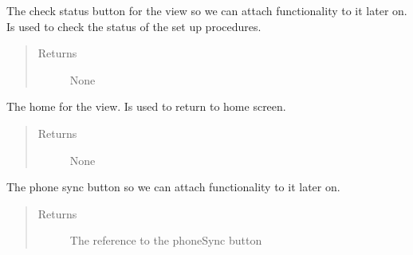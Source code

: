 \documentclass[letterpaper,10pt,english]{sphinxmanual}
\begin{document}
\begin{fulllineitems}
\begin{fulllineitems}
\label{\detokenize{index:src.Views.View_VerifySetupScreen.VerifySetupWindow.set_BtnCheck}}
The check status button for the view so we can attach functionality to it later on.
Is used to check the status of the set up procedures.
\begin{quote}\begin{description}
\item[{Returns}] \leavevmode
None

\end{description}\end{quote}

\end{fulllineitems}


\begin{fulllineitems}
\label{\detokenize{index:src.Views.View_VerifySetupScreen.VerifySetupWindow.set_BtnHome}}
The home for the view. Is used to return to home screen.
\begin{quote}\begin{description}
\item[{Returns}] \leavevmode
None

\end{description}\end{quote}

\end{fulllineitems}


\begin{fulllineitems}
\label{\detokenize{index:src.Views.View_VerifySetupScreen.VerifySetupWindow.set_BtnPhoneSync}}
The phone sync button so we can attach functionality to it later on.
\begin{quote}\begin{description}
\item[{Returns}] \leavevmode
The reference to the phoneSync button


\end{description}
\end{quote}
\end{fulllineitems}
\end{fulllineitems}
\end{document}
